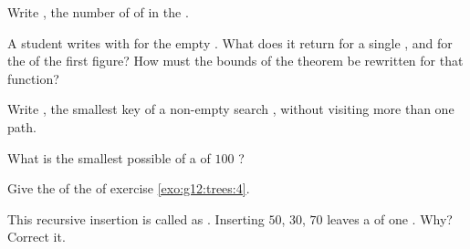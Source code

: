 \begin{exercise}[$\star$]\label{exo:g12:trees:5}
Write , the number of  of   in the  .
\end{exercise}

\begin{exercise}[$\star\star$]\label{exo:g12:trees:6}
A student writes  with  for the empty . What does it return for a single , and
for the  of the first figure? How must the bounds of the theorem be rewritten for that function?
\end{exercise}

\begin{exercise}[$\star\star$]\label{exo:g12:trees:7}
Write , the smallest key of a non-empty search , without visiting more than one path.
\end{exercise}

\begin{exercise}[$\star\star$]\label{exo:g12:trees:8}
What is the smallest possible  of a  of $100$ ?
\end{exercise}

\begin{exercise}[$\star\star$]\label{exo:g12:trees:9}
Give the  of the  of exercise \ref{exo:g12:trees:4}.
\end{exercise}

\begin{exercise}[$\star\star$]\label{exo:g12:trees:10}
This recursive insertion is called as . Inserting $50$, $30$, $70$ leaves a  of one .
Why? Correct it.

\smallskip\noindent\hspace*{2em}

\noindent\hspace*{4em}

\noindent\hspace*{6em}

\noindent\hspace*{4em}

\noindent\hspace*{6em}

\noindent\hspace*{4em}

\noindent\hspace*{6em}

\noindent\hspace*{4em}
\end{exercise}


